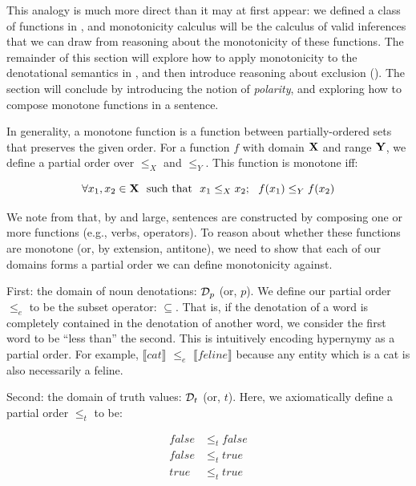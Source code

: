 This analogy is much more direct than it may at first appear:
  we defined a class of functions in 
  ,
  and monotonicity calculus will be the calculus of valid inferences that
  we can draw from reasoning about the monotonicity of these functions.
The remainder of this section will explore how to apply monotonicity to
  the denotational semantics in ,
  and then introduce reasoning about exclusion ().
The section will conclude by introducing the notion of \textit{polarity},
  and exploring how to compose monotone functions in a sentence.



%
%

In generality, a monotone function is a function between partially-ordered sets
  that preserves the given order.
For a function $f$ with domain $\mathbf{X}$ and range $\mathbf{Y}$, we define a partial order over
  $\leq_X$ and $\leq_Y$.
This function is monotone iff:

\begin{equation}
  \forall x_1, x_2 \in \mathbf{X} ~~ \textrm{such that} ~~ x_1 \leq_X x_2; ~~  f(x_1) \leq_Y f(x_2)
\end{equation}

We note from  that, by and large, sentences 
  are constructed by composing one or more functions (e.g., verbs, operators).
To reason about whether these functions are monotone (or, by extension, antitone),
  we need to show that each of our domains forms a partial order we can define
  monotonicity against.

First: the domain of noun denotations: $\mathcal{D}_p$ (or, $p$).
We define our partial order $\leq_e$ to be the subset operator: $\subseteq$.
That is, if the denotation of a word is completely contained in the denotation of
  another word, we consider the first word to be ``less than'' the second.
This is intuitively encoding hypernymy as a partial order.
For example, $\llbracket cat \rrbracket$ $\leq_e$ $\llbracket feline \rrbracket$ because
  any entity which is a cat is also necessarily a feline.

Second: the domain of truth values: $\mathcal{D}_t$ (or, $t$).
Here, we axiomatically define a partial order $\leq_t$ to be:

\begin{align*}
  false &\leq_t false \\
  false &\leq_t true \\
  true &\leq_t true \\
\end{align*}

